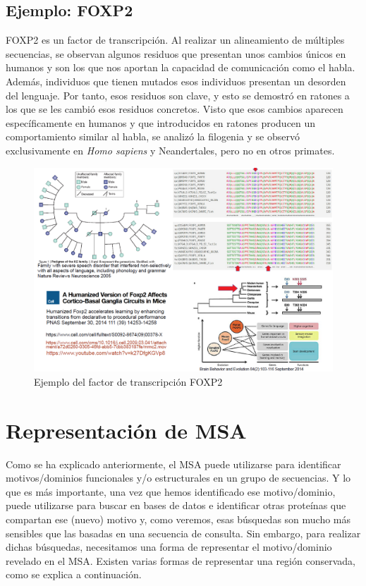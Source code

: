\subsection{Ejemplo: FOXP2}
FOXP2 es un factor de transcripción. Al realizar un alineamiento de múltiples secuencias, se observan algunos residuos que presentan unos cambios únicos en humanos y son los que nos aportan la capacidad de comunicación como el habla. Además, individuos que tienen mutados esos individuos presentan un desorden del lenguaje. Por tanto, esos residuos son clave, y esto se demostró en ratones a los que se les cambió esos residuos concretos. Visto que esos cambios aparecen específicamente en humanos y que introducidos en ratones producen un comportamiento similar al habla, se analizó la filogenia y se observó exclusivamente en \textit{Homo sapiens} y Neandertales, pero no en otros primates.

\begin{figure}[htbp]
\centering
\includegraphics[width = \textwidth]{figs/foxp2.png}
\caption{Ejemplo del factor de transcripción FOXP2}
\end{figure}

\section{Representación de MSA}
Como se ha explicado anteriormente, el MSA puede utilizarse para identificar motivos/dominios funcionales y/o estructurales en un grupo de secuencias. Y lo que es más importante, una vez que hemos identificado ese motivo/dominio, puede utilizarse para buscar en bases de datos e identificar otras proteínas que compartan ese (nuevo) motivo y, como veremos, esas búsquedas son mucho más sensibles que las basadas en una secuencia de consulta. Sin embargo, para realizar dichas búsquedas, necesitamos una forma de representar el motivo/dominio revelado en el MSA. Existen varias formas de representar una región conservada, como se explica a continuación.

